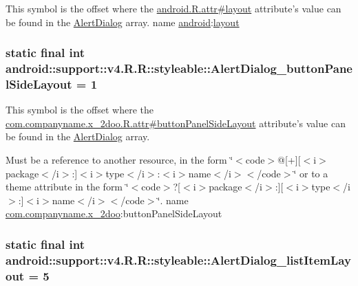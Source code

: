 This symbol is the offset where the \hyperlink{}{android.R.attr\#layout} attribute's value can be found in the \hyperlink{classandroid_1_1support_1_1v4_1_1_r_1_1styleable_984adead369fc9c6b58c85f88690832f}{AlertDialog} array.  name \hyperlink{namespaceandroid}{android}:\hyperlink{classandroid_1_1support_1_1v4_1_1_r_1_1layout}{layout} \hypertarget{classandroid_1_1support_1_1v4_1_1_r_1_1styleable_5035a6dc698e70cff680cbf999f76b5c}{
\subsubsection[{AlertDialog\_\-buttonPanelSideLayout}]{\setlength{\rightskip}{0pt plus 5cm}static final int android::support::v4.R.R::styleable::AlertDialog\_\-buttonPanelSideLayout = 1}}
\label{classandroid_1_1support_1_1v4_1_1_r_1_1styleable_5035a6dc698e70cff680cbf999f76b5c}


This symbol is the offset where the \hyperlink{classcom_1_1companyname_1_1x__2doo_1_1_r_1_1attr_1a453c35f817208e0bb82240ce06904f}{com.companyname.x\_\-2doo.R.attr\#buttonPanelSideLayout} attribute's value can be found in the \hyperlink{classandroid_1_1support_1_1v4_1_1_r_1_1styleable_984adead369fc9c6b58c85f88690832f}{AlertDialog} array.

Must be a reference to another resource, in the form \char`\"{}$<$code$>$@\mbox{[}+\mbox{]}\mbox{[}$<$i$>$package$<$/i$>$:\mbox{]}$<$i$>$type$<$/i$>$:$<$i$>$name$<$/i$>$$<$/code$>$\char`\"{} or to a theme attribute in the form \char`\"{}$<$code$>$?\mbox{[}$<$i$>$package$<$/i$>$:\mbox{]}\mbox{[}$<$i$>$type$<$/i$>$:\mbox{]}$<$i$>$name$<$/i$>$$<$/code$>$\char`\"{}.  name \hyperlink{namespacecom_1_1companyname_1_1x__2doo}{com.companyname.x\_\-2doo}:buttonPanelSideLayout \hypertarget{classandroid_1_1support_1_1v4_1_1_r_1_1styleable_428eb36452bd3ec51c37fc80329506b7}{
\subsubsection[{AlertDialog\_\-listItemLayout}]{\setlength{\rightskip}{0pt plus 5cm}static final int android::support::v4.R.R::styleable::AlertDialog\_\-listItemLayout = 5}}
\label{classandroid_1_1support_1_1v4_1_1_r_1_1styleable_428eb36452bd3ec51c37fc80329506b7}


